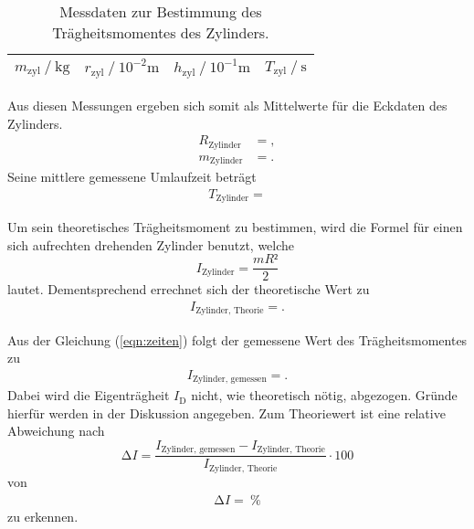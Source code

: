 \begin{table}[H]
  \centering
  \caption{Messdaten zur Bestimmung des Trägheitsmomentes des Zylinders.}
  \label{tab:zyl}
  \begin{tabular}{c c c c}
    \toprule
    {$m_\text{zyl} \ /\ \si{\kilo\gram}$} & {$r_\text{zyl} \ /\ 10^{-2} \si{\metre}$} & {$h_\text{zyl} \ /\ 10^{-1}\si{\metre}$} & {$T_\text{zyl} \ /\ \si{\second}$}\\
    \midrule
    
    \bottomrule
  \end{tabular}
\end{table}

Aus diesen Messungen ergeben sich somit als Mittelwerte für die Eckdaten des Zylinders.
\begin{align*}
  R_{\text{Zylinder}} &= , \\
  m_{\text{Zylinder}} &= .
\end{align*}
Seine mittlere gemessene Umlaufzeit beträgt
\begin{align*}
  T_{\text{Zylinder}} = 
\end{align*}

Um sein theoretisches Trägheitsmoment zu bestimmen, wird die Formel für einen sich aufrechten drehenden Zylinder benutzt, welche
\begin{equation}
  I_{\text{Zylinder}} = \frac{mR²}{2}
\end{equation}
lautet.
Dementsprechend errechnet sich der theoretische Wert zu
\begin{align*}
  I_{\text{Zylinder, Theorie}} = .
\end{align*}

Aus der Gleichung (\ref{eqn:zeiten}) folgt der gemessene Wert des Trägheitsmomentes zu
\begin{align*}
  I_{\text{Zylinder, gemessen}} = .
\end{align*}
Dabei wird die Eigenträgheit $I_\text{D}$ nicht, wie theoretisch nötig, abgezogen.
Gründe hierfür werden in der Diskussion angegeben.
Zum Theoriewert ist eine relative Abweichung nach
\begin{equation}
  \increment I = \frac{I_{\text{Zylinder, gemessen}} - I_{\text{Zylinder, Theorie}}}{I_{\text{Zylinder, Theorie}}} \cdot 100
\end{equation}
von
\begin{align*}
  \increment I =  \:\si{\percent}
\end{align*}
zu erkennen.


